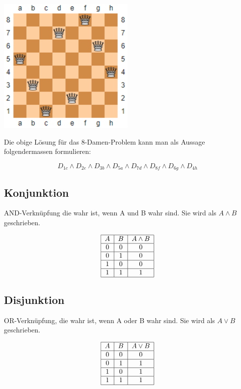 \documentclass[12pt, a4paper, oneside]{article}
\begin{document}
\begin{center}
  \includegraphics[width=0.5\textwidth]{8queens.png}
\end{center}

Die obige Lösung für das 8-Damen-Problem kann man als Aussage folgendermassen formulieren:

\begin{equation*}
  D_{1c} \land D_{2e} \land D_{3b} \land D_{5a} \land D_{7d} \land D_{8f} \land D_{6g} \land D_{4h}
\end{equation*}


\subsection{Konjunktion}
AND-Verknüpfung die wahr ist, wenn A und B wahr sind. Sie wird als $A \land B$ geschrieben.

\begin{equation*}
  \begin{tabular}{| c | c | c |}
    \hline
    $A$ & $B$ & $A \land B$ \\ \hline
    0 & 0 & 0 \\ \hline
    0 & 1 & 0 \\ \hline 
    1 & 0 & 0 \\ \hline
    1 & 1 & 1 \\ \hline
  \end{tabular}
\end{equation*}


\subsection{Disjunktion}
OR-Verknüpfung, die wahr ist, wenn A oder B wahr sind. Sie wird als $A \lor B$ geschrieben.

\begin{equation*}
  \begin{tabular}{| c | c | c |}
    \hline
    $A$ & $B$ & $A \lor B$ \\ \hline
    0 & 0 & 0 \\ \hline
    0 & 1 & 1 \\ \hline
    1 & 0 & 1 \\ \hline
    1 & 1 & 1 \\ \hline
  \end{tabular}
\end{equation*}
\end{document}
